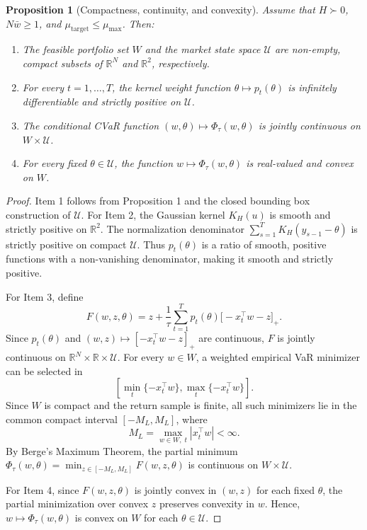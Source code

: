 \documentclass[11pt, a4paper]{article}
\newtheorem{proposition}{Proposition}
\begin{document}
\begin{proposition}[Compactness, continuity, and convexity]
Assume that $H \succ 0$, $N\bar{w} \ge 1$, and $\mu_{\text{target}} \le \mu_{\max}$. Then:
\begin{enumerate}
    \item The feasible portfolio set $W$ and the market state space $\mathcal{U}$ are non-empty, compact subsets of $\mathbb{R}^N$ and $\mathbb{R}^2$, respectively.
    \item For every $t = 1, \dots, T$, the kernel weight function $\theta \mapsto p_t(\theta)$ is infinitely differentiable and strictly positive on $\mathcal{U}$.
    \item The conditional CVaR function $(w, \theta) \mapsto \Phi_\tau(w, \theta)$ is jointly continuous on $W \times \mathcal{U}$.
    \item For every fixed $\theta \in \mathcal{U}$, the function $w \mapsto \Phi_\tau(w, \theta)$ is real-valued and convex on $W$.
\end{enumerate}
\end{proposition}

\begin{proof}
Item 1 follows from Proposition 1 and the closed bounding box construction of $\mathcal{U}$. For Item 2, the Gaussian kernel $K_H(u)$ is smooth and strictly positive on $\mathbb{R}^2$. The normalization denominator $\sum_{s=1}^T K_H(y_{s-1} - \theta)$ is strictly positive on compact $\mathcal{U}$. Thus $p_t(\theta)$ is a ratio of smooth, positive functions with a non-vanishing denominator, making it smooth and strictly positive.

For Item 3, define
\begin{equation}
F(w,z,\theta) = z+\frac{1}{\tau}\sum_{t=1}^{T} p_t(\theta)\big[-x_t^\top w-z\big]_+.
\end{equation}
Since $p_t(\theta)$ and $(w,z)\mapsto[-x_t^\top w-z]_+$ are continuous, $F$ is jointly continuous on $\mathbb R^N\times\mathbb R\times\mathcal{U}$. For every $w\in W$, a weighted empirical VaR minimizer can be selected in
\begin{equation}
\left[\min_t\{-x_t^\top w\},\max_t\{-x_t^\top w\}\right].
\end{equation}
Since $W$ is compact and the return sample is finite, all such minimizers lie in the common compact interval $[-M_L,M_L]$, where
\begin{equation}
M_L=\max_{w\in W,\;t}|x_t^\top w|<\infty.
\end{equation}
By Berge's Maximum Theorem, the partial minimum $\Phi_\tau(w, \theta) = \min_{z \in [-M_L, M_L]} F(w, z, \theta)$ is continuous on $W \times \mathcal{U}$.

For Item 4, since $F(w, z, \theta)$ is jointly convex in $(w, z)$ for each fixed $\theta$, the partial minimization over convex $z$ preserves convexity in $w$. Hence, $w \mapsto \Phi_\tau(w, \theta)$ is convex on $W$ for each $\theta \in \mathcal{U}$.
\end{proof}
\end{document}
